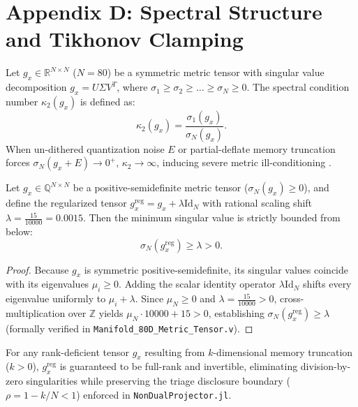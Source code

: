 \section*{Appendix D: Spectral Structure and Tikhonov Clamping}
\label{app:spectral}

\begin{definition}
Let $g_x \in \mathbb{R}^{N \times N}$ ($N = 80$) be a symmetric metric tensor with singular value decomposition $g_x = U \Sigma V^T$, where $\sigma_1 \ge \sigma_2 \ge \dots \ge \sigma_N \ge 0$. The spectral condition number $\kappa_2(g_x)$ is defined as:
\begin{equation}
  \kappa_2(g_x) = \frac{\sigma_1(g_x)}{\sigma_N(g_x)}.
\end{equation}
When un-dithered quantization noise $E$ or partial-deflate memory truncation forces $\sigma_N(g_x + E) \to 0^+$, $\kappa_2 \to \infty$, inducing severe metric ill-conditioning \cite{bronstein2021geometric, anonymous2026geometry}.
\end{definition}

\begin{theorem}
Let $g_x \in \mathbb{Q}^{N \times N}$ be a positive-semidefinite metric tensor ($\sigma_N(g_x) \ge 0$), and define the regularized tensor $g_x^{\mathrm{reg}} = g_x + \lambda \mathrm{Id}_N$ with rational scaling shift $\lambda = \frac{15}{10000} = 0.0015$. Then the minimum singular value is strictly bounded from below:
\begin{equation}
  \sigma_N(g_x^{\mathrm{reg}}) \ge \lambda > 0.
\end{equation}
\end{theorem}

\begin{proof}
Because $g_x$ is symmetric positive-semidefinite, its singular values coincide with its eigenvalues $\mu_i \ge 0$. Adding the scalar identity operator $\lambda \mathrm{Id}_N$ shifts every eigenvalue uniformly to $\mu_i + \lambda$. Since $\mu_N \ge 0$ and $\lambda = \frac{15}{10000} > 0$, cross-multiplication over $\mathbb{Z}$ yields $\mu_N \cdot 10000 + 15 > 0$, establishing $\sigma_N(g_x^{\mathrm{reg}}) \ge \lambda$ (formally verified in \texttt{Manifold\_80D\_Metric\_Tensor.v}).
\end{proof}

\begin{corollary}
For any rank-deficient tensor $g_x$ resulting from $k$-dimensional memory truncation ($k > 0$), $g_x^{\mathrm{reg}}$ is guaranteed to be full-rank and invertible, eliminating division-by-zero singularities while preserving the triage disclosure boundary ($\rho = 1 - k/N < 1$) enforced in \texttt{NonDualProjector.jl}.
\end{corollary}
